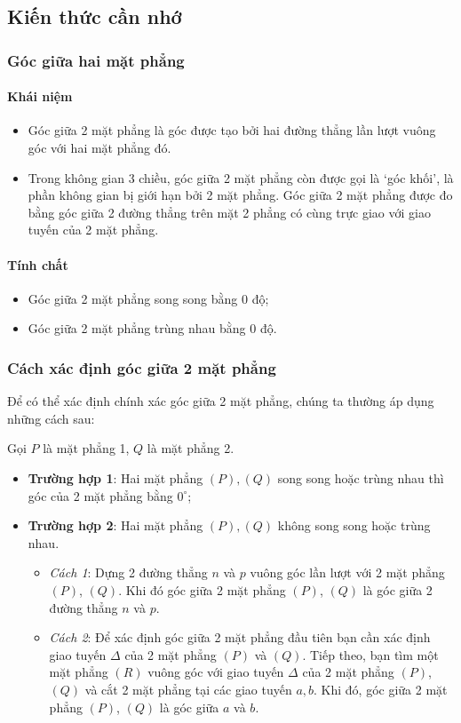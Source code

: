 \subsection{Kiến thức cần nhớ}
\begin{khung}
\subsubsection{Góc giữa hai mặt phẳng}
	\paragraph{Khái niệm}
	\begin{itemize}
		\item Góc giữa 2 mặt phẳng là góc được tạo bởi hai đường thẳng lần lượt vuông góc với hai mặt phẳng đó.
		\item Trong không gian 3 chiều, góc giữa 2 mặt phẳng còn được gọi là \lq góc khối\rq, là phần không gian bị giới hạn bởi 2 mặt phẳng. Góc giữa 2 mặt phẳng được đo bằng góc giữa 2 đường thẳng trên mặt 2 phẳng có cùng trực giao với giao tuyến của 2 mặt phẳng.
		\end{itemize}
	\paragraph{Tính chất}
			\begin{itemize}
				\item Góc giữa 2 mặt phẳng song song bằng $ 0 $ độ;
				\item Góc giữa 2 mặt phẳng trùng nhau bằng $ 0 $ độ.
			\end{itemize}
\subsubsection{Cách xác định góc giữa 2 mặt phẳng}
Để có thể xác định chính xác góc giữa 2 mặt phẳng, chúng ta thường áp dụng những cách sau:
 
Gọi $ P $ là mặt phẳng 1, $ Q $ là mặt phẳng 2.
	\begin{itemize}
		\item \textbf{Trường hợp 1}: Hai mặt phẳng $ (P), (Q) $ song song hoặc trùng nhau thì góc của 2 mặt phẳng bằng $ 0^\circ $;
		\item \textbf{Trường hợp 2}: Hai mặt phẳng $ (P), (Q) $ không song song hoặc trùng nhau.
	\begin{itemize}
		\item \textit{Cách 1}: Dựng 2 đường thẳng $ n $ và $ p $ vuông góc lần lượt với 2 mặt phẳng $ (P) $, $ (Q) $. Khi đó góc giữa 2 mặt phẳng $ (P) $, $ (Q) $ là góc giữa 2 đường thẳng $ n $ và $ p $.
		\item \textit{Cách 2}: Để xác định góc giữa 2 mặt phẳng đầu tiên bạn cần xác định giao tuyến $ \Delta $ của 2 mặt phẳng $ (P) $ và $ (Q) $. Tiếp theo, bạn tìm một mặt phẳng $ (R) $ vuông góc với giao tuyến $ \Delta $ của 2 mặt phẳng $ (P) $, $ (Q) $ và cắt 2 mặt phẳng tại các giao tuyến $ a, b $.
		Khi đó, góc giữa 2 mặt phẳng $ (P) $, $ (Q) $ là góc giữa $ a $ và $ b $.
		\end{itemize}
	\end{itemize}
\end{khung}
